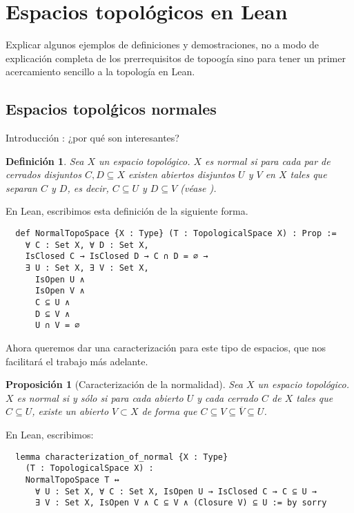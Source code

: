 \documentclass{article}
\newtheorem{definition}{Definición}[section]
\newtheorem{proposition}{Proposición}[section]
\begin{document}
\section{Espacios topológicos en Lean}

Explicar algunos ejemplos de definiciones y demostraciones, no a modo de explicación completa de los prerrequisitos de topoogía sino para tener un primer acercamiento sencillo a la topología en Lean.

\subsection{Espacios topolǵicos normales}

Introducción : ¿por qué son interesantes?

\begin{definition}
  Sea $X$ un espacio topológico. $X$ es \emph{normal} si para cada par de cerrados disjuntos $C, D \subseteq X$ existen abiertos disjuntos $U$ y $V$ en $X$ tales  que separan $C$ y $D$, es decir, $C \subseteq U$ y $D \subseteq V$ \textnormal{(véase \cite[p. 99]{willard2012general})}.
\end{definition}

En Lean, escribimos esta definición de la siguiente forma.

\begin{lstlisting}
  def NormalTopoSpace {X : Type} (T : TopologicalSpace X) : Prop :=
    ∀ C : Set X, ∀ D : Set X,
    IsClosed C → IsClosed D → C ∩ D = ∅ →
    ∃ U : Set X, ∃ V : Set X,
      IsOpen U ∧
      IsOpen V ∧
      C ⊆ U ∧
      D ⊆ V ∧
      U ∩ V = ∅
\end{lstlisting}

Ahora queremos dar una caracterización para este tipo de espacios, que nos facilitará el trabajo más adelante.

\begin{proposition}[Caracterización de la normalidad]
  Sea $X$ un espacio topológico. $X$ es normal si y sólo si para cada abierto $U$ y cada cerrado $C$ de $X$ tales que $C \subseteq U$, existe un abierto $V \subset X$ de forma que $C \subseteq V \subseteq \overline{V} \subseteq U$.
\end{proposition}

En Lean, escribimos:

\begin{lstlisting}
  lemma characterization_of_normal {X : Type}
    (T : TopologicalSpace X) :
    NormalTopoSpace T ↔
      ∀ U : Set X, ∀ C : Set X, IsOpen U → IsClosed C → C ⊆ U →
      ∃ V : Set X, IsOpen V ∧ C ⊆ V ∧ (Closure V) ⊆ U := by sorry
\end{lstlisting}
\end{document}
